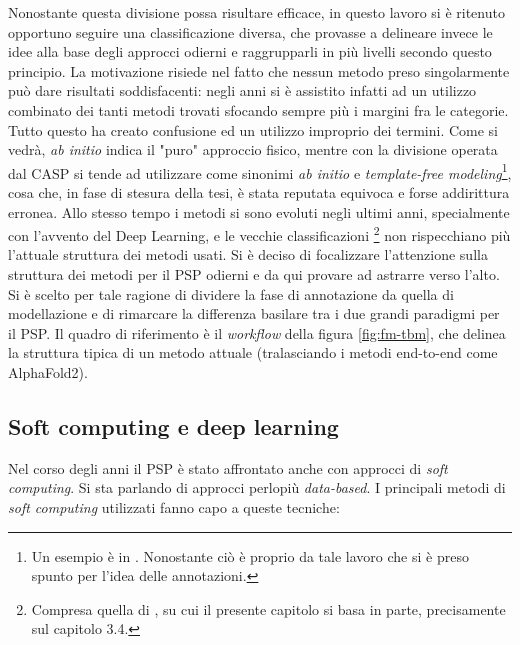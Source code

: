 {\par Nonostante questa divisione possa risultare efficace, in questo lavoro si è ritenuto opportuno seguire una classificazione diversa, che provasse a delineare invece le idee alla base degli approcci odierni e raggrupparli in più livelli secondo questo principio. La motivazione risiede nel fatto che nessun metodo preso singolarmente può dare risultati soddisfacenti: negli anni si è assistito infatti ad un utilizzo combinato dei tanti metodi trovati sfocando sempre più i margini fra le categorie. Tutto questo ha creato confusione ed un utilizzo improprio dei termini. Come si vedrà, \textit{ab initio} indica il "puro" approccio fisico, mentre con la divisione operata dal CASP si tende ad utilizzare come sinonimi \textit{ab initio} e \textit{template-free modeling}\footnote{Un esempio è in . Nonostante ciò è proprio da tale lavoro che si è preso spunto per l'idea delle annotazioni.}, cosa che, in fase di stesura della tesi, è stata reputata equivoca e forse addirittura erronea. Allo stesso tempo i metodi si sono evoluti negli ultimi anni, specialmente con l'avvento del Deep Learning, e le vecchie classificazioni \footnote{Compresa quella di , su cui il presente capitolo si basa in parte, precisamente sul capitolo 3.4.} non rispecchiano più l'attuale struttura dei metodi usati. Si è deciso di focalizzare l'attenzione sulla struttura dei metodi per il PSP odierni e da qui provare ad astrarre verso l'alto. Si è scelto per tale ragione di dividere la fase di annotazione da quella di modellazione e di rimarcare la differenza basilare tra i due grandi paradigmi per il PSP. Il quadro di riferimento è il \textit{workflow} della figura \ref{fig:fm-tbm}, che delinea la struttura tipica di un metodo attuale (tralasciando i metodi end-to-end come AlphaFold2). 

}

\subsection{Soft computing e deep learning}

Nel corso degli anni il PSP è stato affrontato anche con approcci di \textit{soft computing}. Si sta parlando di approcci perlopiù \textit{data-based}. I principali metodi di \textit{soft computing }utilizzati fanno capo a queste tecniche\supercite{marquez2015soft}:

